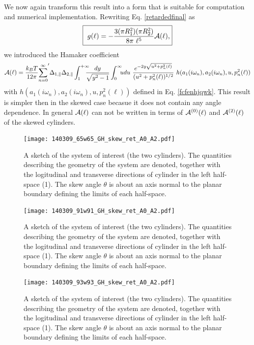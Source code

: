 \documentclass[onecolumn,letterpaper,amsmath,amssymb,floatfix,aps,superscriptaddress]{revtex4}
\begin{document}
We now again transform this result into a form that is suitable for computation and numerical implementation. Rewriting Eq. \ref{retardedfinal} as
\begin{equation}
  \fbox{
    $\displaystyle{
g(\ell) = - \frac{3 (\pi R_1^{2}) (\pi R_2^{2})}{8\pi~\ell^5} {\cal A}(\ell),}$}
\label{retardedfinal-a}
\end{equation}
we introduced the Hamaker coefficient
\begin{equation}
{\cal A}(\ell) = \frac{k_BT}{12 \pi} {\sum_{n=0}^{\infty}}' \Delta_{1,\parallel} \Delta_{2,\parallel} 
\int_{1}^{+\infty}\!\!\!\!\! \frac{dy}{\sqrt{y^2 - 1}} \int_0^{\infty}\!\!\!  u du ~\frac{e^{-2 y \sqrt{u^{2} + p_n^{2}(\ell)}}}{(u^{2} +p_n^{2}(\ell))^{1/2}} ~h(a_1(i \omega_n), a_2(i \omega_n), u, p_n^{2}(\ell))
\label{retardedfinal-b}
\end{equation}
with $h(a_1(i \omega_n), a_2(i \omega_n), u, p_n^{2}(\ell))$ defined in Eq. \ref{fcfenhjqwk}. This result is simpler then in the skewed case becasue it does not contain any angle dependence. In general ${\cal A}(\ell)$ can not be written in terms of ${\cal A}^{(0)}(\ell)$ and ${\cal A}^{(2)}(\ell)$ of the skewed cylinders.

\begin{figure}
\centerline{\texttt{[image: 140309\_65w65\_GH\_skew\_ret\_A0\_A2.pdf]}}
\caption{A sketch of the system of interest (the two cylinders). The quantities describing the geometry of the system are 
denoted, together with the logitudinal and transverse directions of cylinder in the left half-space (1). The skew angle $\theta$ is about an axis normal to the planar boundary defining the limits of each half-space.
}
\label{fig:sketch}
\end{figure}

\begin{figure}
\centerline{\texttt{[image: 140309\_91w91\_GH\_skew\_ret\_A0\_A2.pdf]}}
\caption{A sketch of the system of interest (the two cylinders). The quantities describing the geometry of the system are 
denoted, together with the logitudinal and transverse directions of cylinder in the left half-space (1). The skew angle $\theta$ is about an axis normal to the planar boundary defining the limits of each half-space.
}
\label{fig:sketch}
\end{figure}

\begin{figure}
\centerline{\texttt{[image: 140309\_93w93\_GH\_skew\_ret\_A0\_A2.pdf]}}
\caption{A sketch of the system of interest (the two cylinders). The quantities describing the geometry of the system are 
denoted, together with the logitudinal and transverse directions of cylinder in the left half-space (1). The skew angle $\theta$ is about an axis normal to the planar boundary defining the limits of each half-space.
}
\label{fig:sketch}
\end{figure}
\end{document}
